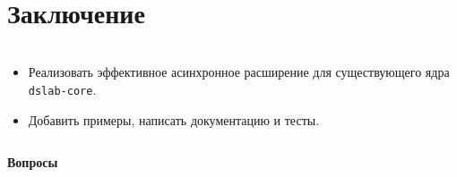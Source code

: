 \documentclass[t]{beamer}  %
\begin{document}
\section{Заключение}

\begin{frame}[fragile]
	\frametitle{\insertsection} 
	\framesubtitle{\insertsubsection}

	\vspace{-0.5cm}
	\begin{columns}
		\begin{column}{1.1\linewidth}
			\begin{itemize}
				\item[\ding{51}] Реализовать эффективное асинхронное расширение для существующего ядра \texttt{dslab-core}.
				\item[\ding{51}] Добавить примеры, написать документацию и тесты.
			\end{itemize}
		\end{column}
	\end{columns}
\end{frame}

\begin{frame}{}
	\centering
	\vspace{3.5cm}
\Huge \textcolor{HSEblue}{\textbf{Вопросы}}

\end{frame}
\end{document}
